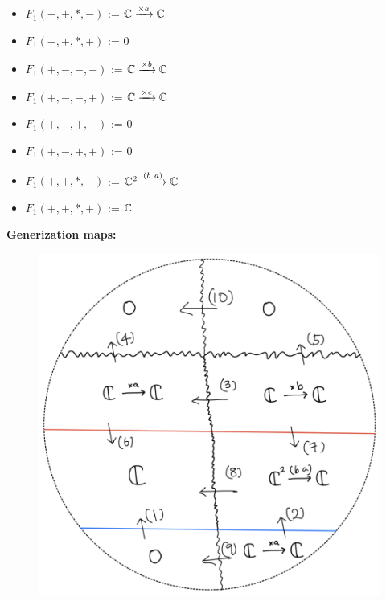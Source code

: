 \begin{itemize}
\item $F_1(-,+,*,-)$ := $\mathbb{C}\xrightarrow{\times a}\mathbb{C}$
\item $F_1(-,+,*,+)$ := $0$
\item $F_1(+,-,-,-)$ := $\mathbb{C} \xrightarrow{\times b} \mathbb{C} $
\item $F_1(+,-,-,+)$ := $\mathbb{C} \xrightarrow{\times c} \mathbb{C} $
\item $F_1(+,-,+,-)$ := $0$
\item $F_1(+,-,+,+)$ := $0$
\item $F_1(+,+,*,-)$ := $\mathbb{C}^2\xrightarrow{(b~a)}\mathbb{C}$
\item $F_1(+,+,*,+)$ := $\mathbb{C}$
\end{itemize}
\textbf{Generization maps:}
\begin{figure}[H]
    \centering
    \includegraphics[scale = 0.45]{diagrams/cobord'2/47.png} 
    \caption{}
    \label{fig:your-label}
\end{figure}
